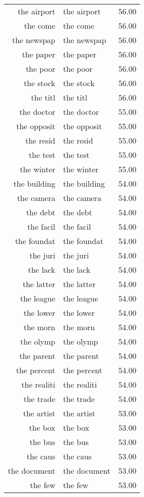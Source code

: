 \begin{table}[ht]
\begin{tabular}{rlr}
  the airport & the airport & 56.00 \\ 
  the come & the come & 56.00 \\ 
  the newspap & the newspap & 56.00 \\ 
  the paper & the paper & 56.00 \\ 
  the poor & the poor & 56.00 \\ 
  the stock & the stock & 56.00 \\ 
  the titl & the titl & 56.00 \\ 
  the doctor & the doctor & 55.00 \\ 
  the opposit & the opposit & 55.00 \\ 
  the resid & the resid & 55.00 \\ 
  the test & the test & 55.00 \\ 
  the winter & the winter & 55.00 \\ 
  the building & the building & 54.00 \\ 
  the camera & the camera & 54.00 \\ 
  the debt & the debt & 54.00 \\ 
  the facil & the facil & 54.00 \\ 
  the foundat & the foundat & 54.00 \\ 
  the juri & the juri & 54.00 \\ 
  the lack & the lack & 54.00 \\ 
  the latter & the latter & 54.00 \\ 
  the league & the league & 54.00 \\ 
  the lower & the lower & 54.00 \\ 
  the morn & the morn & 54.00 \\ 
  the olymp & the olymp & 54.00 \\ 
  the parent & the parent & 54.00 \\ 
  the percent & the percent & 54.00 \\ 
  the realiti & the realiti & 54.00 \\ 
  the trade & the trade & 54.00 \\ 
  the artist & the artist & 53.00 \\ 
  the box & the box & 53.00 \\ 
  the bus & the bus & 53.00 \\ 
  the caus & the caus & 53.00 \\ 
  the document & the document & 53.00 \\ 
  the few & the few & 53.00 \\ 

\end{tabular}
\end{table}

